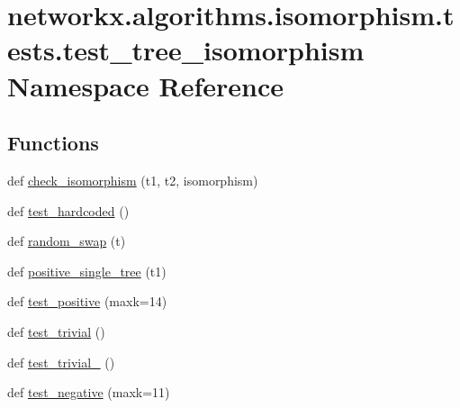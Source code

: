 \hypertarget{namespacenetworkx_1_1algorithms_1_1isomorphism_1_1tests_1_1test__tree__isomorphism}{}\section{networkx.\+algorithms.\+isomorphism.\+tests.\+test\+\_\+tree\+\_\+isomorphism Namespace Reference}
\label{namespacenetworkx_1_1algorithms_1_1isomorphism_1_1tests_1_1test__tree__isomorphism}
\subsection*{Functions}
\begin{DoxyCompactItemize}
\item 
def \hyperlink{namespacenetworkx_1_1algorithms_1_1isomorphism_1_1tests_1_1test__tree__isomorphism_acbc71d42e70a43b31c89eb2bcb57fda4}{check\+\_\+isomorphism} (t1, t2, isomorphism)
\item 
def \hyperlink{namespacenetworkx_1_1algorithms_1_1isomorphism_1_1tests_1_1test__tree__isomorphism_abd5d474e962d946831ae92975c95239a}{test\+\_\+hardcoded} ()
\item 
def \hyperlink{namespacenetworkx_1_1algorithms_1_1isomorphism_1_1tests_1_1test__tree__isomorphism_a5ea831d8480657fa08eda2e2775e3f11}{random\+\_\+swap} (t)
\item 
def \hyperlink{namespacenetworkx_1_1algorithms_1_1isomorphism_1_1tests_1_1test__tree__isomorphism_a8cdee10101921dfcd8282f5110d3fd93}{positive\+\_\+single\+\_\+tree} (t1)
\item 
def \hyperlink{namespacenetworkx_1_1algorithms_1_1isomorphism_1_1tests_1_1test__tree__isomorphism_a6c27a4d74c1fcb5002dbf41097f2b22b}{test\+\_\+positive} (maxk=14)
\item 
def \hyperlink{namespacenetworkx_1_1algorithms_1_1isomorphism_1_1tests_1_1test__tree__isomorphism_a27349d1b97c0f16764871f5c95387bc9}{test\+\_\+trivial} ()
\item 
def \hyperlink{namespacenetworkx_1_1algorithms_1_1isomorphism_1_1tests_1_1test__tree__isomorphism_a3e93ba67ba0213ef511624709b0bb01f}{test\+\_\+trivial\+\_} ()
\item 
def \hyperlink{namespacenetworkx_1_1algorithms_1_1isomorphism_1_1tests_1_1test__tree__isomorphism_a0cc649e4d736c486cef344cdf348a15d}{test\+\_\+negative} (maxk=11)
\end{DoxyCompactItemize}


